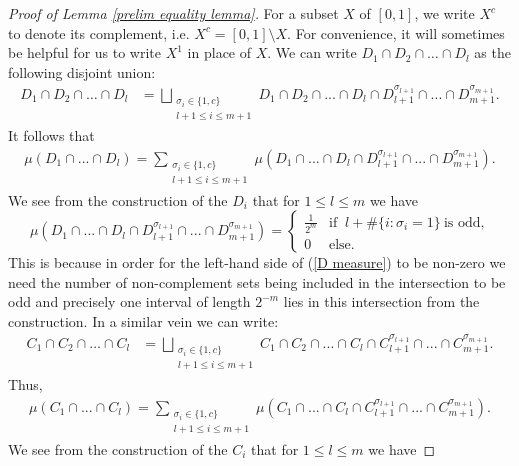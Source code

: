 \documentclass[10pt,a4paper]{amsart}
\begin{document}
\begin{proof}[Proof of Lemma \ref{prelim equality lemma}]
For a subset $X$ of $[0,1]$, we write $X^c$ to denote its complement, i.e. $X^c=[0,1]\setminus X$. For convenience, it will sometimes be helpful for us to write $X^1$ in place of $X$. We can write $D_1 \cap D_2 \cap \dots \cap D_l$ as the following disjoint union:
 \begin{align*}
     D_1 \cap D_2 \cap \dots \cap D_l &= \bigsqcup_{\substack{\sigma_i \in \{1,c\} \\ l+1 \leq i \leq m+1}} D_1 \cap D_2 \cap ...\cap D_l \cap D_{l+1}^{\sigma_{l+1}} \cap ... \cap D_{m+1}^{\sigma_{m+1}}. 
 \end{align*}
It follows that 
    \begin{align}\label{D decompose}
        \mu(D_1 \cap...\cap D_l)=\sum_{\substack{\sigma_i \in \{1,c\} \\ l+1 \leq i \leq m+1}} \mu\left(D_1\cap...\cap D_l \cap D_{l+1}^{\sigma_{l+1}} \cap ...\cap D_{m+1}^{\sigma_{m+1}} \right).
    \end{align}
We see from the construction of the $D_i$ that for $1 \leq l \leq m$ we have
\begin{equation}\label{D measure}
\mu\left(D_1\cap...\cap D_l \cap D_{l+1}^{\sigma_{l+1}} \cap ... \cap D_{m+1}^{\sigma_{m+1}}\right)=
    \begin{cases}
        \frac{1}{2^m}  & \text{if } ~ l+ \#\{i:\sigma_i=1\} ~\text{is odd,}\\
        0 & \text{else. }
    \end{cases}
\end{equation}
This is because in order for the left-hand side of (\ref{D measure}) to be non-zero we need the number of non-complement sets being included in the intersection to be odd and precisely one interval of length $2^{-m}$ lies in this intersection from the construction.
In a similar vein we can write:
\begin{align*}
     C_1 \cap C_2 \cap \dots \cap C_l &= \bigsqcup_{\substack{\sigma_i \in \{1,c\} \\ l+1 \leq i \leq m+1}} C_1 \cap C_2 \cap ...\cap C_l \cap C_{l+1}^{\sigma_{l+1}} \cap ... \cap C_{m+1}^{\sigma_{m+1}}. 
 \end{align*} 
 Thus,
\begin{align}\label{C decompose}
    \mu\left(C_1 \cap...\cap C_l\right)=\sum_{\substack{\sigma_i \in \{1,c\} \\ l+1 \leq i \leq m+1}} \mu\left(C_1\cap...\cap C_l \cap C_{l+1}^{\sigma_{l+1}} \cap ...\cap C_{m+1}^{\sigma_{m+1}}\right).
\end{align}
We see from the construction of the $C_i$ that for $1 \leq l \leq m$ we have

\end{proof}
\end{document}
